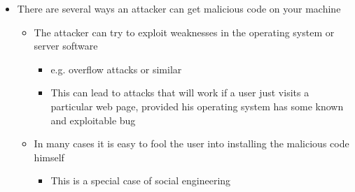 \documentclass[11pt]{article}
\begin{document}
\begin{itemize}
\item There are several ways an attacker can get malicious code on your machine
\begin{itemize}
\item The attacker can try to exploit weaknesses in the operating system or server software
\begin{itemize}
\item e.g. overflow attacks or similar
\item This can lead to attacks that will work if a user just visits a particular web page, provided  his operating system has some known and exploitable bug
\end{itemize}
\item In many cases it is easy to fool the user into installing the malicious code himself
\begin{itemize}
\item This is a special case of social engineering
\end{itemize}
\end{itemize}
\end{itemize}
\end{document}
